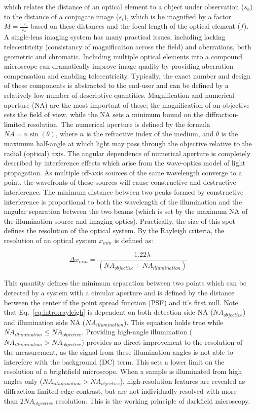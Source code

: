 \noindent which relates the distance of an optical element to a object under observation ($s_o$) to the distance of a conjugate image ($s_i$), which is be magnified by a factor $M = \frac{-s_i}{s_o}$ based on these distances and the focal length of the optical element ($f$). A single-lens imaging system has many practical issues, including lacking telecentricity (consistancy of magnificaiton across the field) and aberrations, both geometric and chromatic. Including multiple optical elements into a compound microscope can dramatically improve image quality by providing aberration compensation and enabling telecentricity. Typically, the exact number and design of these components is abstracted to the end-user and can be defined by a relatively low number of descriptive quantities. Magnification and numerical aperture (NA) are the most important of these; the magnification of an objective sets the field of view, while the NA sets a minimum bound on the diffraction-limited resolution. The numerical aperture is defined by the formula $NA=n\sin (\theta)$, where $n$ is the refractive index of the medium, and $\theta$ is the maximum half-angle at which light may pass through the objective relative to the radial (optical) axis. The angular dependence of numerical aperture is completely described by interference effects which arise from the wave-optics model of light propagation. As multiple off-axis sources of the same wavelength converge to a point, the wavefronts of these sources will cause constructive and destructive interference. The minimum distance between two peaks formed by constructive interference is proportional to both the wavelength of the illumination and the angular separation between the two beams (which is set by the maximum NA of the illumination source and imaging optics). Practically, the size of this spot defines the resolution of the optical system. By the Rayleigh criteria, the resolution of an optical system $x_{min}$ is defined as:

\begin{equation}\label{eq:intro:rayleigh}
\Delta x_{min}  = \frac{1.22 \lambda}{(NA_{objective} + NA_{illumination})}
\end{equation}

This quantity defines the minimum separation between two points which can be detected by a system with a circular aperture and is defined by the distance between the center if the point spread function (PSF) and it's first null. Note that Eq.~\ref{eq:intro:rayleigh} is dependent on both detection side NA ($NA_{objective}$) and illumination side NA ($NA_{illumination}$).
This equation holds true while $NA_{illumination} \leq NA_{objective}$. Providing high-angle illumination ($NA_{illumination} > NA_{objective}$) provides no direct improvement to the resolution of the measurement, as the signal from these illumination angles is not able to interefere with the background (DC) term. This sets a lower limit on the resolution of a brightfield microscope. When a sample is illuminated from high angles only ($NA_{illumination} > NA_{objective}$), high-resolution features are revealed as diffraction-limited edge contrast, but are not individually resolved with more than $2NA_{objective}$ resolution. This is the working principle of darkfield microscopy.

